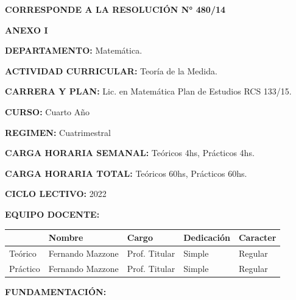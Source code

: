 \documentclass[a4paper, 12pt]{article}
\begin{document}
\cfoot{}



\begin{flushleft}
 \textbf{\large CORRESPONDE A LA RESOLUCIÓN N° 480/14}
\end{flushleft}


\begin{center}
 \textbf{\large ANEXO I}
\end{center}





 \textbf{DEPARTAMENTO:}  Matemática.

 \textbf{ACTIVIDAD CURRICULAR:} Teoría de la Medida.

 \textbf{CARRERA Y PLAN:}  Lic. en Matemática Plan de Estudios RCS 133/15.

\textbf{CURSO:} Cuarto Año

\textbf{REGIMEN:} Cuatrimestral

\textbf{CARGA HORARIA SEMANAL:} Teóricos 4hs, Prácticos 4hs. 

\textbf{CARGA HORARIA TOTAL:} Teóricos 60hs, Prácticos 60hs.

    \textbf{CICLO LECTIVO:} 2022



\textbf{EQUIPO DOCENTE:}  

\begin{table}[h]
\begin{tabular}{|l|l|l|l|l|}\hline
& Nombre & Cargo  & Dedicación & Caracter\\ \hline
Teórico & Fernando Mazzone & Prof. Titular & Simple & Regular\\\hline
Práctico & Fernando Mazzone & Prof. Titular & Simple & Regular\\\hline 
\end{tabular} 
\end{table}

\textbf{FUNDAMENTACIÓN:}
\end{document}
